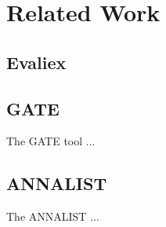 \section{Related Work}
\label{sec:related-work}


\subsection{Evaliex}

\subsection{\acs{GATE}}
The \gls{GATE} tool ...

\subsection{\acs{ANNALIST}}
The \gls{ANNALIST} ...
